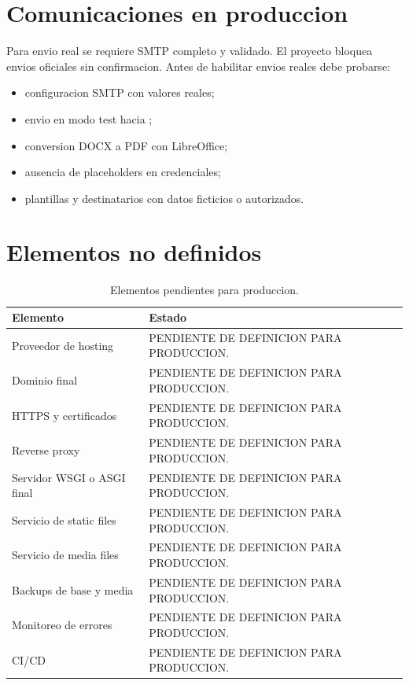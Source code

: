 \section{Comunicaciones en produccion}
\label{sec:despliegue-comunicaciones}

Para envio real se requiere SMTP completo y validado. El proyecto bloquea envios oficiales sin confirmacion. Antes de habilitar envios reales debe probarse:

\begin{itemize}
  \item configuracion SMTP con valores reales;
  \item envio en modo test hacia ;
  \item conversion DOCX a PDF con LibreOffice;
  \item ausencia de placeholders en credenciales;
  \item plantillas y destinatarios con datos ficticios o autorizados.
\end{itemize}

\section{Elementos no definidos}
\label{sec:despliegue-pendientes}

\begin{longtable}{p{4.5cm}p{7.8cm}}
\caption{Elementos pendientes para produccion.}
\label{tab:despliegue-pendientes}\\
\toprule
Elemento & Estado \\
\midrule
Proveedor de hosting & PENDIENTE DE DEFINICION PARA PRODUCCION. \\
Dominio final & PENDIENTE DE DEFINICION PARA PRODUCCION. \\
HTTPS y certificados & PENDIENTE DE DEFINICION PARA PRODUCCION. \\
Reverse proxy & PENDIENTE DE DEFINICION PARA PRODUCCION. \\
Servidor WSGI o ASGI final & PENDIENTE DE DEFINICION PARA PRODUCCION. \\
Servicio de static files & PENDIENTE DE DEFINICION PARA PRODUCCION. \\
Servicio de media files & PENDIENTE DE DEFINICION PARA PRODUCCION. \\
Backups de base y media & PENDIENTE DE DEFINICION PARA PRODUCCION. \\
Monitoreo de errores & PENDIENTE DE DEFINICION PARA PRODUCCION. \\
CI/CD & PENDIENTE DE DEFINICION PARA PRODUCCION. \\
\bottomrule
\end{longtable}

